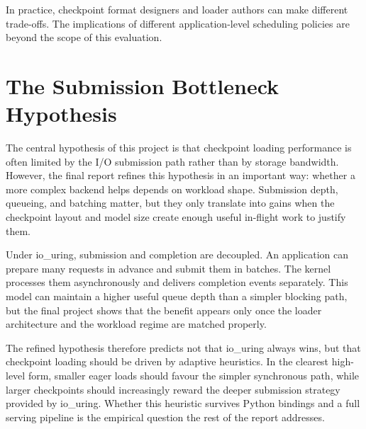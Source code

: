 In practice, checkpoint format designers and loader authors can make different trade-offs. The implications of different application-level scheduling policies are beyond the scope of this evaluation.

\section{The Submission Bottleneck Hypothesis}

The central hypothesis of this project is that checkpoint loading performance is often limited by the I/O submission path rather than by storage bandwidth. However, the final report refines this hypothesis in an important way: whether a more complex backend helps depends on workload shape. Submission depth, queueing, and batching matter, but they only translate into gains when the checkpoint layout and model size create enough useful in-flight work to justify them.

Under io\_uring, submission and completion are decoupled. An application can prepare many requests in advance and submit them in batches. The kernel processes them asynchronously and delivers completion events separately. This model can maintain a higher useful queue depth than a simpler blocking path, but the final project shows that the benefit appears only once the loader architecture and the workload regime are matched properly.

The refined hypothesis therefore predicts not that io\_uring always wins, but that checkpoint loading should be driven by adaptive heuristics. In the clearest high-level form, smaller eager loads should favour the simpler synchronous path, while larger checkpoints should increasingly reward the deeper submission strategy provided by io\_uring. Whether this heuristic survives Python bindings and a full serving pipeline is the empirical question the rest of the report addresses.
